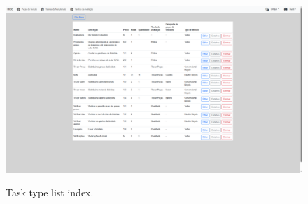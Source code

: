 \begin{figure}[h]
  \caption{Task type list index.}
  \centering
  \includegraphics[width=\textwidth]{figs/Implementation/dealershipAdmin/taskIndex}
  \label{fig:taskIndex}
\end{figure}



